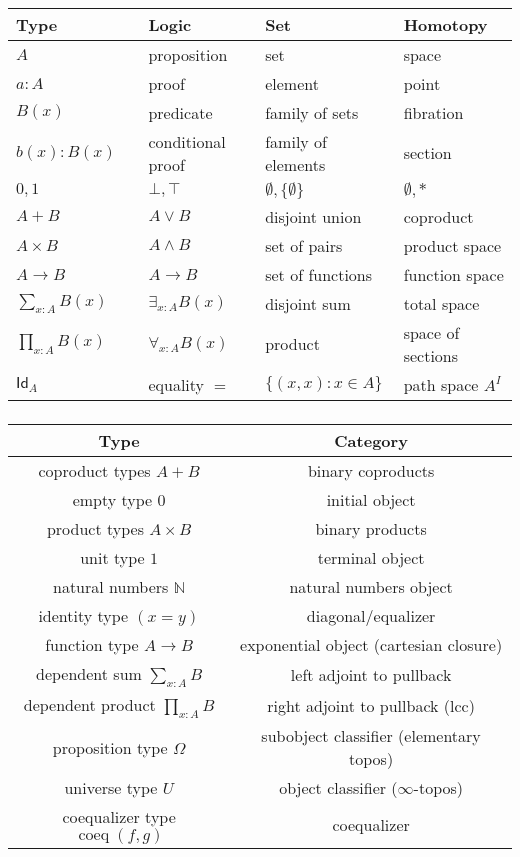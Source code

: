 \documentclass[UTF8,aspectratio=43,11pt,colorlinks,compress,openany]{beamer}%
\begin{document}
\begin{frame}\frametitle{}
\centering
	\begin{tabu}{lllll}
		\hline
		\textbf{Type} && \textbf{Logic} & \textbf{Set} & \textbf{Homotopy}\\
		\hline
		$A$ && proposition & set & space\\
		$a: A$ && proof & element & point\\
		$B(x)$ && predicate & family of sets & fibration\\
		$b(x): B(x)$ && conditional proof & family of elements & section\\
		$0,1$ && $\bot, \top$ & $\emptyset, \{\emptyset\}$ & $\emptyset, *$\\
		$A + B$ && $A\vee B$ & disjoint union & coproduct\\
		$A\times B$ && $A\wedge B$ & set of pairs & product space\\
		$A\to B$ && $A\to B$ & set of functions & function space\\
		$\sum_{x:A}B(x)$ && $\exists_{x:A}B(x)$ & disjoint sum & total space\\
		$\prod_{x:A}B(x)$ && $\forall_{x:A}B(x)$ & product & space of sections\\
		$\mathsf{Id}_A$ && equality $=$ & $\{(x,x): x\in A\}$ & path space $A^I$\\
		\hline
	\end{tabu}
\end{frame}

\begin{frame}\frametitle{}
\centering
\begin{tabu}{c|c}
 \hline
 \textbf{Type} & \textbf{Category}\\
 \hline
 coproduct types $A+B$ & binary coproducts\\
 empty type $0$ & initial object\\
 product types $A\times B$ & binary products\\
 unit type $1$ & terminal object\\
 natural numbers $\mathbb{N}$ & natural numbers object\\
 identity type $(x=y)$ & diagonal/equalizer\\
 function type $A\to B$ & exponential object (cartesian closure)\\
 dependent sum $\sum_{x:A} B$ & left adjoint to pullback\\
 dependent product $\prod_{x:A} B$ & right adjoint to pullback (lcc)\\
 proposition type $\Omega$ & subobject classifier (elementary topos)\\
 universe type $U$ & object classifier ($\infty$-topos)\\
 coequalizer type $\operatorname{coeq}(f,g)$ & coequalizer\\
 \hline
\end{tabu}
\end{frame}
\end{document}
